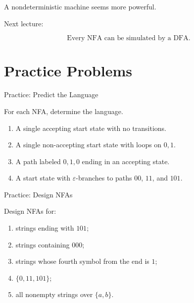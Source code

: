 \documentclass[10pt,aspectratio=169]{beamer}
\newcommand{\eps}{\varepsilon}
\begin{document}
\begin{frame}[standout]
A nondeterministic machine seems more powerful.

Next lecture:

\[
\text{Every NFA can be simulated by a DFA.}
\]
\end{frame}

\section{Practice Problems}

\begin{frame}{Practice: Predict the Language}

For each NFA, determine the language.

\vspace{1em}

\begin{enumerate}
\item A single accepting start state with no transitions.
\item A single non-accepting start state with loops on \(0,1\).
\item A path labeled \(0,1,0\) ending in an accepting state.
\item A start state with \(\eps\)-branches to paths \(00\), \(11\), and \(101\).
\end{enumerate}

\end{frame}

\begin{frame}{Practice: Design NFAs}

Design NFAs for:

\begin{enumerate}
\item strings ending with \(101\);
\item strings containing \(000\);
\item strings whose fourth symbol from the end is \(1\);
\item \(\{0,11,101\}\);
\item all nonempty strings over \(\{a,b\}\).
\end{enumerate}

\end{frame}
\end{document}
